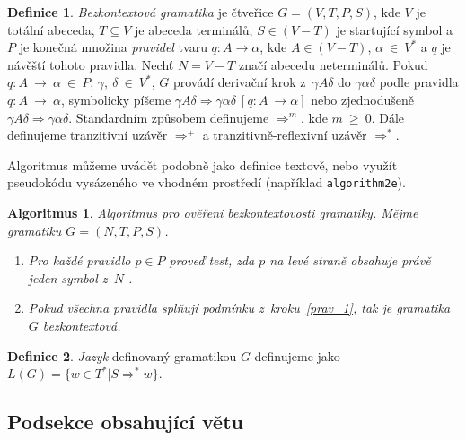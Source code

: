 \documentclass[11pt, a4paper]{article}
\theoremstyle{definition}
\newtheorem{definice}{Definice}[section]
\theoremstyle{plain}
\newtheorem{algoritmus}{Algoritmus}[section]
\begin{document}
\begin{twocolumn}
\begin{definice}
\label{def_1_1}
\emph{Bezkontextová gramatika} je čtveřice $G=(V,T,P,S)$, kde $V$ je totální abeceda,
$T \subseteq V$ je abe\-ceda terminálů, $S \in (V-T)$ je startující symbol a~$P$ \linebreak je konečná množina \emph{pravidel} 
tvaru $q\colon A\!\rightarrow \alpha$, kde \linebreak $A \in (V-T)$, $\alpha~\in~V^*$ a $q$ je návěští tohoto pravi\-dla. Nechť $N = V-T$ značí abecedu neterminálů.
Po\-kud $q\colon A~\rightarrow~\alpha~\in~P$, $\gamma,~\delta~\in~V^*$, $G$ provádí derivační \linebreak krok z~$\gamma A\delta$ do $\gamma\alpha\delta$ podle pravidla $q\colon A~\rightarrow~\alpha$, sym\-bolicky píšeme
$\gamma A\delta \Rightarrow \gamma\alpha\delta\ [q\colon A~\rightarrow \alpha]$ nebo zjed\-nodušeně $\gamma A\delta \Rightarrow \gamma\alpha\delta$. Standardním způsobem definu\-jeme $\Rightarrow^m$, kde $m~\geq~0$. Dále definujeme tranzitivní uzávěr $\Rightarrow^+$ a tranzitivně-reflexivní uzávěr $\Rightarrow^*$.
\end{definice}

Algoritmus můžeme uvádět podobně jako definice \linebreak textově, nebo využít pseudokódu vysázeného ve vhodném prostředí (například \verb|algorithm2e|).

\setcounter{algoritmus}{1}
\begin{algoritmus}
Algoritmus pro ověření bezkontextovosti gramatiky. Mějme gramatiku $G = (N, T, P, S)$.
\begin{enumerate}
\item \label{prav_1}Pro každé pravidlo $p \in P$ proveď test, zda $p$ na levé straně obsahuje právě jeden symbol z~$N$ .
\item Pokud všechna pravidla splňují podmínku z~kroku~\ref{prav_1}, tak je gramatika $G$ bezkontextová.
\end{enumerate}
\end{algoritmus}

\setcounter{definice}{2}
\begin{definice} \emph{Jazyk} definovaný gramatikou $G$ definujeme jako $L(G)=\{w \in T^*|S \Rightarrow^* w\}$.
\end{definice}

\subsection{Podsekce obsahující větu}


\end{twocolumn}
\end{document}
